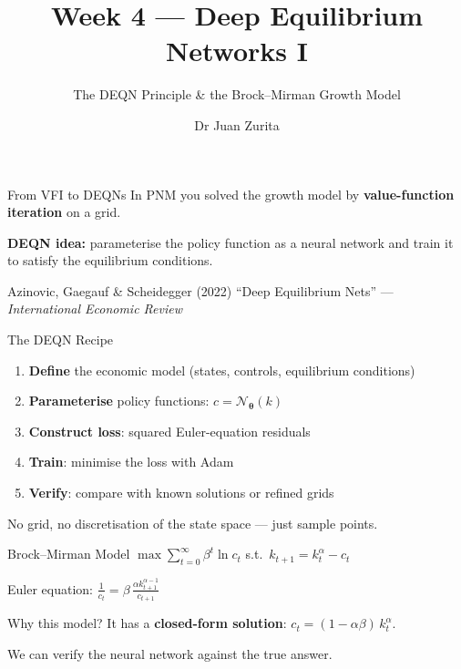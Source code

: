 \documentclass[aspectratio=169, 10pt]{beamer}
\title{Week 4 --- Deep Equilibrium Networks I}
\subtitle{The DEQN Principle \& the Brock--Mirman Growth Model}
\author{Dr Juan Zurita}
\institute{Deep Learning for Macroeconomics\\
The University of Edinburgh~$\cdot$~School of Economics}
\date{}
\begin{document}
\maketitle

\begin{frame}{From VFI to DEQNs}
In PNM you solved the growth model by \textbf{value-function iteration} on a grid.

\bigskip
\textbf{DEQN idea:} parameterise the policy function as a neural network and train it to satisfy the \alert{equilibrium conditions}.

\bigskip
\begin{block}{Azinovic, Gaegauf \& Scheidegger (2022)}
``Deep Equilibrium Nets'' --- \textit{International Economic Review}
\end{block}
\end{frame}

\begin{frame}{The DEQN Recipe}
\begin{enumerate}
\item \textbf{Define} the economic model (states, controls, equilibrium conditions)
\item \textbf{Parameterise} policy functions: $c = \mathcal{N}_{\boldsymbol{\theta}}(k)$
\item \textbf{Construct loss}: squared Euler-equation residuals
\item \textbf{Train}: minimise the loss with Adam
\item \textbf{Verify}: compare with known solutions or refined grids
\end{enumerate}

\bigskip
No grid, no discretisation of the state space --- just sample points.
\end{frame}

\begin{frame}{Brock--Mirman Model}
$\max \sum_{t=0}^{\infty} \beta^t \ln c_t$ \quad s.t.\ $k_{t+1} = k_t^\alpha - c_t$

\bigskip
Euler equation: $\frac{1}{c_t} = \beta\,\frac{\alpha k_{t+1}^{\alpha-1}}{c_{t+1}}$

\bigskip
\begin{block}{Why this model?}
It has a \textbf{closed-form solution}: $c_t = (1 - \alpha\beta)\,k_t^\alpha$.

We can verify the neural network against the true answer.
\end{block}
\end{frame}
\end{document}
